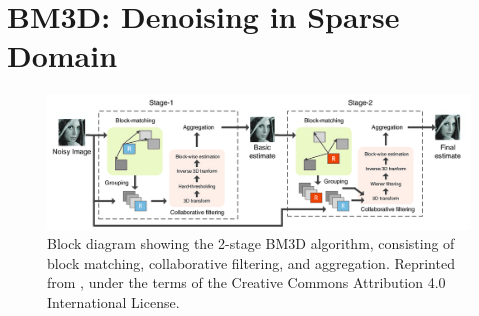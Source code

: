 



\section{BM3D: Denoising in Sparse Domain}\label{sec:bm3d}

\begin{figure}
    \centering
    \includegraphics[width=1\linewidth]{images/bm3d_schematic.png}
    \caption{Block diagram showing the 2-stage \gls{BM3D} algorithm, consisting of block matching, collaborative filtering, and aggregation. Reprinted from \cite{wangFPGABasedHardwareAccelerator2020}, under the terms of the Creative Commons Attribution 4.0 International License.}
    \label{fig:bm3d-schematic}
\end{figure}


